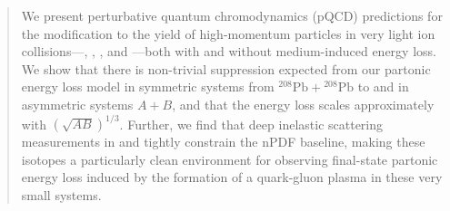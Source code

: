 \documentclass[%
 reprint,
 amsmath,amssymb,
 aps,
 prl,nofootinbib,
 superscriptaddress
]{revtex4-2}
\begin{document}
\begin{abstract}

We present perturbative quantum chromodynamics (pQCD) predictions for the modification to the yield of high-momentum particles in very light ion collisions---\btbt, \lili, , and ---both with and without medium-induced energy loss. 
We show that there is non-trivial suppression expected from our partonic energy loss model in symmetric systems from ${}^{208}\mathrm{Pb} + {}^{208}\mathrm{Pb}$ to  and in asymmetric systems $A + B$, and that the energy loss scales approximately with $(\sqrt{A B})^{1 / 3}$. 
Further, we find that deep inelastic scattering measurements in  and \li{} tightly constrain the nPDF baseline, making these isotopes a particularly clean environment for observing final-state partonic energy loss induced by the formation of a quark-gluon plasma in these very small systems.

\end{abstract}

\maketitle
\end{document}
